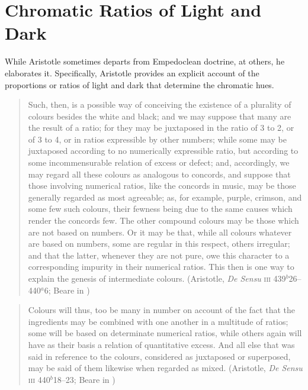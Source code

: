 

\section{Chromatic Ratios of Light and Dark} %
\label{sec:chromatic_ratios_of_light_and_dark}

While Aristotle sometimes departs from Empedoclean doctrine, at others, he elaborates it. Specifically, Aristotle provides an explicit account of the proportions or ratios of light and dark that determine the chromatic hues.

\begin{quote}
	Such, then, is a possible way of conceiving the existence of a plurality of colours besides the white and black; and we may suppose that many are the result of a ratio; for they may be juxtaposed in the ratio of 3 to 2, or of 3 to 4, or in ratios expressible by other numbers; while some may be juxtaposed according to no numerically expressible ratio, but according to some incommensurable relation of excess or defect; and, accordingly, we may regard all these colours as analogous to concords, and suppose that those involving numerical ratios, like the concords in music, may be those generally regarded as most agreeable; as, for example, purple, crimson, and some few such colours, their fewness being due to the same causes which render the concords few. The other compound colours may be those which are not based on numbers. Or it may be that, while all colours whatever are based on numbers, some are regular in this respect, others irregular; and that the latter, whenever they are not pure, owe this character to a corresponding impurity in their numerical ratios. This then is one way to explain the genesis of intermediate colours. (Aristotle, \emph{De Sensu} \textsc{iii} 439\( ^{b} \)26--440\( ^{a} \)6; Beare in \citealt[8]{Barnes:1984uq})
\end{quote}

\begin{quote}
	Colours will thus, too be many in number on account of the fact that the ingredients may be combined with one another in a multitude of ratios; some will be based on determinate numerical ratios, while others again will have as their basis a relation of quantitative excess. And all else that was said in reference to the colours, considered as juxtaposed or superposed, may be said of them likewise when regarded as mixed. (Aristotle, \emph{De Sensu} \textsc{iii} 440\( ^{b} \)18--23; Beare in \citealt[10]{Barnes:1984uq})
\end{quote}

